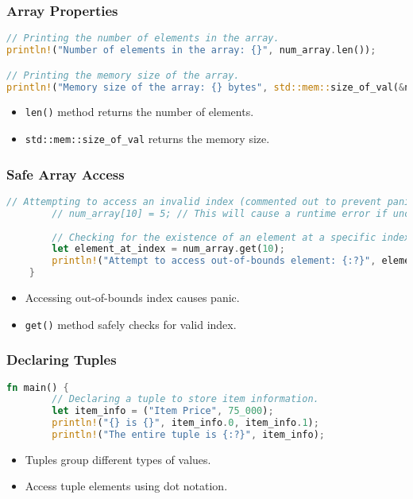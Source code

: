 \documentclass[aspectratio=169, table]{beamer}
\begin{document}
\begin{frame}[fragile]
\frametitle{Array Properties}
\begin{lstlisting}[language=Rust]
// Printing the number of elements in the array.
println!("Number of elements in the array: {}", num_array.len());

// Printing the memory size of the array.
println!("Memory size of the array: {} bytes", std::mem::size_of_val(&num_array));
\end{lstlisting}
\begin{itemize}
\item \texttt{len()} method returns the number of elements.
\item \texttt{std::mem::size\_of\_val} returns the memory size.
\end{itemize}
\end{frame}

\begin{frame}[fragile]
	\frametitle{Safe Array Access}
	\begin{lstlisting}[language=Rust]
		// Attempting to access an invalid index (commented out to prevent panic).
		// num_array[10] = 5; // This will cause a runtime error if uncommented.
		
		// Checking for the existence of an element at a specific index.
		let element_at_index = num_array.get(10);
		println!("Attempt to access out-of-bounds element: {:?}", element_at_index);
	}
\end{lstlisting}
\begin{itemize}
	\item Accessing out-of-bounds index causes panic.
	\item \texttt{get()} method safely checks for valid index.
\end{itemize}
\end{frame}
\begin{frame}[fragile]
\frametitle{Declaring Tuples}
\begin{lstlisting}[language=Rust]
	fn main() {
		// Declaring a tuple to store item information.
		let item_info = ("Item Price", 75_000);
		println!("{} is {}", item_info.0, item_info.1); 
		println!("The entire tuple is {:?}", item_info);
	\end{lstlisting}
	\begin{itemize}
		\item Tuples group different types of values.
		\item Access tuple elements using dot notation.
	\end{itemize}
\end{frame}
\end{document}
